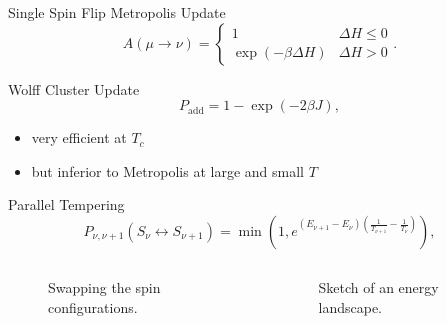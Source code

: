 \documentclass{beamer}
\newcommand{\brac}[1]{\ensuremath{\left(#1\right)}}
\begin{document}
        \begin{frame}{Single Spin Flip Metropolis Update \cite{Metropolis1953}}
            \begin{equation}
                A(\mu \to \nu) =
                \begin{cases}
                    1                            & \Delta H \le 0 \\
                    \exp{\brac{-\beta \Delta H}} & \Delta H > 0
                \end{cases}.
            \end{equation}
        \end{frame}

        \begin{frame}{Wolff Cluster Update \cite{Wolff1989}}
            \begin{equation}
                P_{\mathrm{add}} = 1-\exp\brac{-2\beta J},
            \end{equation}
            \pause
            \begin{itemize}[<+->]
                \item very efficient at \(T_{c}\)
                \item but inferior to Metropolis at large and small \(T\)
            \end{itemize}
        \end{frame}

        \begin{frame}{Parallel Tempering \cite{ParallelTempering1986}}
            \begin{equation}
                P_{\nu,\nu+1}(S_\nu \leftrightarrow S_{\nu+1}) = \min\brac{1,e^{\brac{E_{\nu+1}-E_\nu}\brac{\frac{1}{T_{\nu+1}}-\frac{1}{T_\nu}}}},
            \end{equation}
            \begin{columns}[b]
                \begin{column}{5cm}
                    \begin{figure}[htbp]
                        \centering
                        
                        \caption
                        {
                            Swapping the spin configurations.
                        }
                    \end{figure}
                \end{column}
                \pause
                \begin{column}{6cm}
                    \begin{figure}[htbp]
                        \centering
                        
                        \caption
                        {
                            Sketch of an energy landscape.
                        }
                    \end{figure}
                \end{column}
            \end{columns}
        \end{frame}
\end{document}
